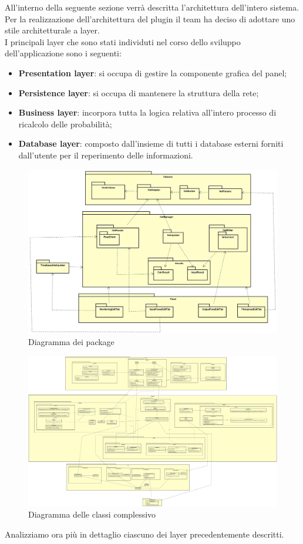 \pagebreak
{}
All'interno della seguente sezione verrà descritta l'architettura dell'intero sistema.
Per la realizzazione dell'architettura del plugin il team ha deciso di adottare uno stile architetturale a layer.\\
I principali layer che sono stati individuti nel corso dello sviluppo dell'applicazione sono i seguenti:
\begin{itemize}
	\item{\textbf{Presentation layer}: si occupa di gestire la componente grafica del panel;}
	\item{\textbf{Persistence layer}: si occupa di mantenere la struttura della rete;}
	\item{\textbf{Business layer}: incorpora tutta la logica relativa all’intero processo di ricalcolo delle probabilità;}
	\item{\textbf{Database layer}: composto dall’insieme di tutti i database esterni forniti dall’utente per il reperimento delle informazioni.}
\end{itemize}
\begin{figure} [H]
	\centering
	\includegraphics[scale=0.25]{Img/Diagramma_Package}
	\caption{Diagramma dei package}\label{}
\end{figure}
\begin{figure} [H]
	\centering
	\includegraphics[scale=0.07]{Img/Diagramma_Classi}
	\caption{Diagramma delle classi complessivo}\label{}
\end{figure}
Analizziamo ora più in dettaglio ciascuno dei layer precedentemente descritti.
